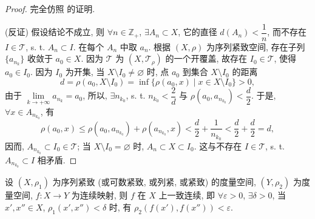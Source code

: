 \begin{proof}
完全仿照 的证明.

(反证) 假设结论不成立, 则 $\forall n \in \mathbb{Z}_{+}$, $\exists A_{n} \subset X$, 它的直径 $d(A_{n}) < \dfrac{1}{n}$, 而不存在 $I \in \mathcal{T}$, s. t. $A_{n} \subset I$. 在每个 $A_{n}$ 中取 $a_{n}$. 根据 $(X, \rho)$ 为序列紧致空间, 存在子列 $\{a_{n_{k}}\}$ 收敛于 $a_{0} \in X$. 因为 $\mathcal{T}$ 为 $(X, \mathcal{T}_{\rho})$ 的一个开覆盖, 故存在 $I_{0} \in \mathcal{T}$, 使得 $a_{0} \in I_{0}$. 因为 $I_{0}$ 为开集, 当 $X \setminus I_{0} \neq \varnothing$ 时, 点 $a_{0}$ 到集合 $X \setminus I_{0}$ 的距离
\[
  d = \rho(a_{0}, X \setminus I_{0}) = \inf\{\rho(a_{0}, x) \mid x \in X \setminus I_{0}\} > 0,
\]
由于 $\lim\limits_{k \to +\infty} a_{n_{k}} = a_{0}$, 所以, $\exists n_{k_{0}}$, s. t. $n_{k_{0}} < \dfrac{2}{d}$ 与 $\rho(a_{0}, a_{n_{k_{0}}}) < \dfrac{d}{2}$. 于是, $\forall x \in A_{n_{k_{0}}}$, 有
\[
  \rho(a_{0}, x) \leqslant \rho(a_{0}, a_{n_{k_{0}}}) + \rho(a_{n_{k_{0}}}, x) < \frac{d}{2} + \frac{1}{n_{k_{0}}} < \frac{d}{2} + \frac{d}{2} = d,
\]
因而, $A_{n_{k_{0}}} \subset I_{0} \in \mathcal{T}$; 当 $X \setminus I_{0} = \varnothing$ 时, $A_{n} \subset X \subset I_{0}$. 这与不存在 $I \in \mathcal{T}$, s. t. $A_{n_{k_{0}}} \subset I$ 相矛盾.
\end{proof}

\begin{theorem}[一致连续性定理]\label{thm:7.4.5}
设 $(X, \rho_{1})$ 为序列紧致 (或可数紧致, 或列紧, 或紧致) 的度量空间, $(Y, \rho_{2})$ 为度量空间, $f\colon X \to Y$ 为连续映射, 则 $f$ 在 $X$ 上一致连续, 即 $\forall \varepsilon > 0$, $\exists \delta > 0$, 当 $x', x'' \in X$, $\rho_{1}(x', x'') < \delta$ 时, 有 $\rho_{2}(f(x'), f(x'')) < \varepsilon$.
\end{theorem}

